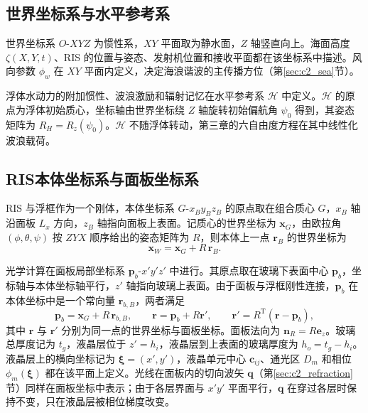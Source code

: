 \subsection{世界坐标系与水平参考系}

世界坐标系 $O$-$XYZ$ 为惯性系，$XY$ 平面取为静水面，$Z$ 轴竖直向上。海面高度 $\zeta(X,Y,t)$、RIS 的位置与姿态、发射机位置和接收平面都在该坐标系中描述。风向参数 $\phi_w$ 在 $XY$ 平面内定义，决定海浪谐波的主传播方位（第\ref{sec:c2_sea}节）。

浮体水动力的附加惯性、波浪激励和辐射记忆在水平参考系 $\mathcal H$ 中定义。$\mathcal H$ 的原点为浮体初始质心，坐标轴由世界坐标绕 $Z$ 轴旋转初始偏航角 $\psi_0$ 得到，其姿态矩阵为 $R_H=R_z(\psi_0)$。$\mathcal H$ 不随浮体转动，第三章的六自由度方程在其中线性化波浪载荷。

\subsection{RIS本体坐标系与面板坐标系}

RIS 与浮框作为一个刚体，本体坐标系 $G$-$x_By_Bz_B$ 的原点取在组合质心 $G$，$x_B$ 轴沿面板 $L_x$ 方向，$z_B$ 轴指向面板上表面。记质心的世界坐标为 $\mathbf x_G$，由欧拉角 $(\phi,\theta,\psi)$ 按 $ZYX$ 顺序给出的姿态矩阵为 $R$，则本体上一点 $\mathbf r_B$ 的世界坐标为
\begin{equation}
\mathbf x_W=\mathbf x_G+R\,\mathbf r_B.
\label{eq:c2_body}
\end{equation}

光学计算在面板局部坐标系 $\mathbf p_b$-$x'y'z'$ 中进行。其原点取在玻璃下表面中心 $\mathbf p_b$，坐标轴与本体坐标轴平行，$z'$ 轴指向玻璃上表面。由于面板与浮框刚性连接，$\mathbf p_b$ 在本体坐标中是一个常向量 $\mathbf r_{b,B}$，两者满足
\begin{equation}
\mathbf p_b=\mathbf x_G+R\,\mathbf r_{b,B},\qquad
\mathbf r=\mathbf p_b+R\mathbf r',\qquad \mathbf r'=R^{\mathrm T}(\mathbf r-\mathbf p_b),
\label{eq:c2_frame}
\end{equation}
其中 $\mathbf r$ 与 $\mathbf r'$ 分别为同一点的世界坐标与面板坐标。面板法向为 $\mathbf n_R=R\mathbf e_z$。玻璃总厚度记为 $t_g$，液晶层位于 $z'=h_i$，液晶层到上表面的玻璃厚度为 $h_o=t_g-h_i$。液晶层上的横向坐标记为 $\boldsymbol\xi=(x',y')$，液晶单元中心 $\mathbf c_{ij}$、通光区 $D_m$ 和相位 $\phi_m(\boldsymbol\xi)$ 都在该平面上定义。光线在面板内的切向波矢 $\mathbf q$（第\ref{sec:c2_refraction}节）同样在面板坐标中表示；由于各层界面与 $x'y'$ 平面平行，$\mathbf q$ 在穿过各层时保持不变，只在液晶层被相位梯度改变。

